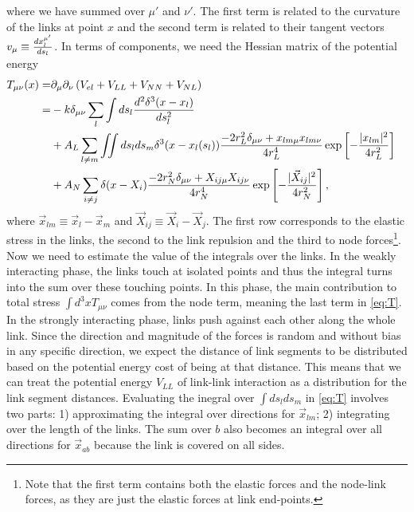 \documentclass[linenumbers,endfloats,nofootinbib,preprint,floatfix,titlepage,superscriptaddress]{revtex4-1} %
\begin{document}
where we have summed over $\mu'$ and $\nu'$. 
The first term is related to the curvature of the links at point $x$ and the second term is related to their tangent vectors $v_\mu \equiv {d x_l^{\mu'}\over ds_l}$.  
In terms of components, we need the Hessian matrix of the potential energy
\begin{align}
    T_{\mu\nu}(x) =&  %
    \ro_\mu \ro_\nu \pr{V_{el}+V_{LL} + V_{NN}+V_{NL}} \cr
    =& %
    -{k}\delta_{\mu\nu} \sum_l\int ds_l {d^2 \delta^3(x-x_l)\over ds_l^2} \cr
    & + A_L \sum_{l\ne m} \iint ds_l ds_m \delta^3(x-x_l(s_l))\frac{-2r_L^2\delta_{\mu\nu}+ x_{lm\mu} x_{lm\nu}}{4r_L^4}
     \exp\left[- {|x_{lm}|^2 \over 4 r_L^2}\right]\cr
    &+ A_N\sum_{i\ne j}\delta(x-X_i)\frac{-2r_N^2\delta_{\mu\nu}+ X_{ij\mu}X_{ij\nu}}{4r_N^4}
    \exp\left[- {|\vec{X}_{ij}|^2 \over 4 r_N^2}\right],
    \label{eq:T}
\end{align}
where $\vec{x}_{lm} \equiv \vec{x}_l-\vec{x}_m$ and $\vec{X}_{ij} \equiv \vec{X}_i-\vec{X}_j$. The first row corresponds to the elastic stress in the links, the second to the link repulsion and the third to node forces\footnote{
Note that the first term contains both the elastic forces and the node-link forces, as they are just the elastic forces at link end-points.}. 
Now we need to estimate the value of the integrals over the links.
In the weakly interacting phase, the links touch at isolated points and thus the integral turns into the sum over these touching points. 
In this phase, the main contribution to total stress $\int d^3 x T_{\mu\nu}$ comes from the node term, meaning the last term in \eqref{eq:T}. 
In the strongly interacting phase, links push against each other along the whole link. 
Since the direction and magnitude of the forces is random and without bias in any specific direction, we expect the distance of link segments to be distributed based on the potential energy cost of being at that distance. 
This means that we can treat the potential energy $V_{LL}$ of link-link interaction as a distribution for the link segment distances. 
Evaluating the inegral over $\int ds_lds_m$ in \eqref{eq:T} involves two parts: 1) approximating the integral over directions for $\vec{x}_{lm}$; 2) integrating over the length of the links. 
The sum over $b$ also becomes an integral over all directions for $\vec{x}_{ab}$ because the link is covered on all sides. 
\end{document}
